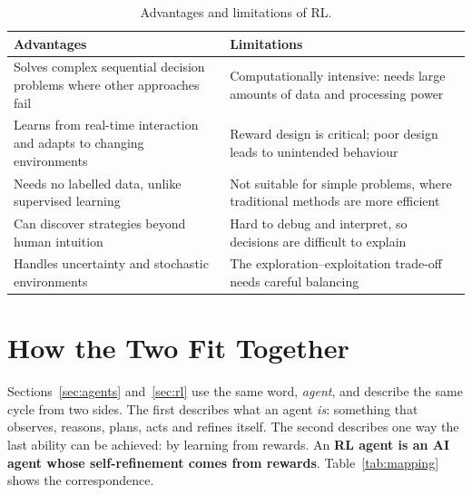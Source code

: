 \documentclass[11pt, a4paper]{article}
\begin{document}
\begin{table}[H]
\centering
\small
\caption{Advantages and limitations of RL.}
\label{tab:proscons}
\begin{tabularx}{\textwidth}{X X}
\toprule
Advantages & Limitations \\
\midrule
Solves complex sequential decision problems where other approaches fail & Computationally intensive: needs large amounts of data and processing power \\
Learns from real-time interaction and adapts to changing environments & Reward design is critical; poor design leads to unintended behaviour \\
Needs no labelled data, unlike supervised learning & Not suitable for simple problems, where traditional methods are more efficient \\
Can discover strategies beyond human intuition & Hard to debug and interpret, so decisions are difficult to explain \\
Handles uncertainty and stochastic environments & The exploration--exploitation trade-off needs careful balancing \\
\bottomrule
\end{tabularx}
\end{table}

\section{How the Two Fit Together}
\label{sec:link}

Sections~\ref{sec:agents} and~\ref{sec:rl} use the same word, \emph{agent}, and describe the same cycle from two sides. The first describes what an agent \emph{is}: something that observes, reasons, plans, acts and refines itself. The second describes one way the last ability can be achieved: by learning from rewards. An \textbf{RL agent is an AI agent whose self-refinement comes from rewards}. Table~\ref{tab:mapping} shows the correspondence.
\end{document}
